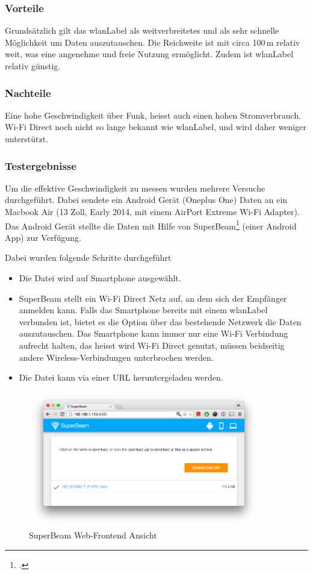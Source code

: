 \subsubsection{Vorteile}
Grundsätzlich gilt das \gls{wlanLabel} als weitverbreitetes und als sehr schnelle Möglichkeit um Daten auszutauschen. Die Reichweite ist mit circa 100\,m relativ weit, was eine angenehme und freie Nutzung ermöglicht.
Zudem ist \gls{wlanLabel} relativ günstig.

\subsubsection{Nachteile}
Eine hohe Geschwindigkeit über Funk, heisst auch einen hohen Stromverbrauch. Wi-Fi Direct noch nicht so lange bekannt wie \gls{wlanLabel}, und wird daher weniger unterstützt.

\subsubsection{Testergebnisse}
Um die effektive Geschwindigkeit zu messen wurden mehrere Versuche durchgeführt.
Dabei sendete ein Android Gerät (Oneplus One) Daten an ein Macbook Air (13 Zoll, Early 2014, mit einem AirPort Extreme Wi-Fi Adapter).
Das Android Gerät stellte die Daten mit Hilfe von SuperBeam\footcite{SuperBeam_WiFi_Direct_Share_Android_Apps_on_Google_Play_2015-05-22} (einer Android App) zur Verfügung.

Dabei wurden folgende Schritte durchgeführt
\begin{itemize}
	\item Die Datei wird auf Smartphone ausgewählt.
	\item SuperBeam stellt ein Wi-Fi Direct Netz auf, an dem sich der Empfänger anmelden kann. Falls das Smartphone bereits mit einem \gls{wlanLabel} verbunden ist, bietet es die Option über das bestehende Netzwerk die Daten auszutauschen.
	Das Smartphone kann immer nur eine Wi-Fi Verbindung aufrecht halten, das heisst wird Wi-Fi Direct genutzt, müssen beidseitig andere Wireless-Verbindungen unterbrochen werden.
	\item Die Datei kann via einer URL heruntergeladen werden.
\end{itemize}

\begin{figure}[H]
	\centering
	\includegraphics[width=0.9\textwidth]{images/alternatives/superbeam_web.png}
	\caption{SuperBeam Web-Frontend Ansicht}
\end{figure}

